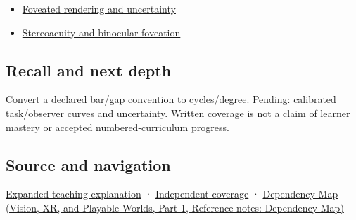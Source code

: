 \hypertarget{appendix-b491fc48c54b-used-by}{}

\begin{itemize}
\tightlist
\item
  \hyperref[appendix-5878b813b732]{Foveated rendering and uncertainty}
\item
  \hyperref[appendix-8dc848f14052]{Stereoacuity and binocular foveation}
\end{itemize}

\subsection{Recall and next depth}\label{appendix-b491fc48c54b-recall-and-next-depth}

\hypertarget{appendix-b491fc48c54b-recall-and-next-depth}{}

Convert a declared bar/gap convention to cycles/degree. Pending: calibrated task/observer curves and uncertainty. Written coverage is not a claim of learner mastery or accepted numbered-curriculum progress.

\subsection{Source and navigation}\label{appendix-b491fc48c54b-source-and-navigation}

\hypertarget{appendix-b491fc48c54b-source-and-navigation}{}

\hyperref[04-visual-computing-ii-ch042-visibility-is-about-contrast-conditions-and-tasks]{Expanded teaching explanation} · \hyperref[appendix-fd090d982a15-xr01---independent-seeing-and-representation-source]{Independent coverage} · \href{../07-Vision-XR-and-Playable-Worlds-P01/main.pdf\#nameddest=appendix-4ad47bdd269a}{Dependency Map (Vision, XR, and Playable Worlds, Part 1, Reference notes: Dependency Map)}
